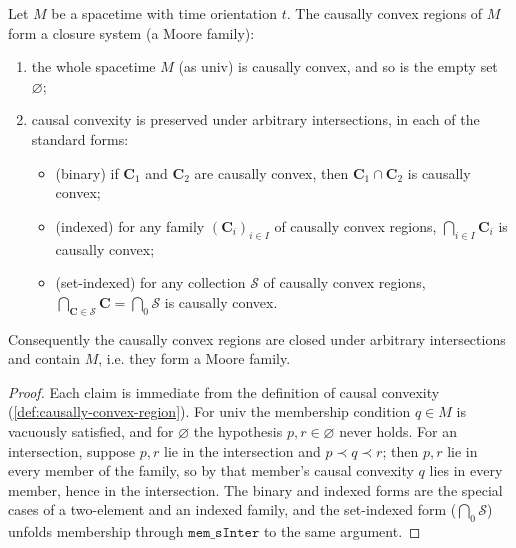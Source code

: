 \begin{lemma}
    \label{lmm:causally-convex-closure-ops}
    \leanok
    Let $M$ be a spacetime with time orientation $t$. The causally convex regions of $M$ form a closure system (a Moore family):
    \begin{enumerate}
        \item the whole spacetime $M$ (as $\mathrm{univ}$) is causally convex, and so is the empty set $\varnothing$;
        \item causal convexity is preserved under arbitrary intersections, in each of the standard forms:
        \begin{itemize}
            \item (binary) if $\mathbf{C}_1$ and $\mathbf{C}_2$ are causally convex, then $\mathbf{C}_1 \cap \mathbf{C}_2$ is causally convex;
            \item (indexed) for any family $(\mathbf{C}_i)_{i \in I}$ of causally convex regions, $\bigcap_{i \in I} \mathbf{C}_i$ is causally convex;
            \item (set-indexed) for any collection $\mathcal{S}$ of causally convex regions, $\bigcap_{\mathbf{C} \in \mathcal{S}} \mathbf{C} = \bigcap_0 \mathcal{S}$ is causally convex.
        \end{itemize}
    \end{enumerate}
    Consequently the causally convex regions are closed under arbitrary intersections and contain $M$, i.e. they form a Moore family.
\end{lemma}
\begin{proof}
    \leanok
    Each claim is immediate from the definition of causal convexity (\ref{def:causally-convex-region}). For $\mathrm{univ}$ the membership condition $q \in M$ is vacuously satisfied, and for $\varnothing$ the hypothesis $p, r \in \varnothing$ never holds. For an intersection, suppose $p, r$ lie in the intersection and $p \prec q \prec r$; then $p, r$ lie in every member of the family, so by that member's causal convexity $q$ lies in every member, hence in the intersection. The binary and indexed forms are the special cases of a two-element and an indexed family, and the set-indexed form ($\bigcap_0 \mathcal{S}$) unfolds membership through $\mathtt{mem\_sInter}$ to the same argument.
\end{proof}

